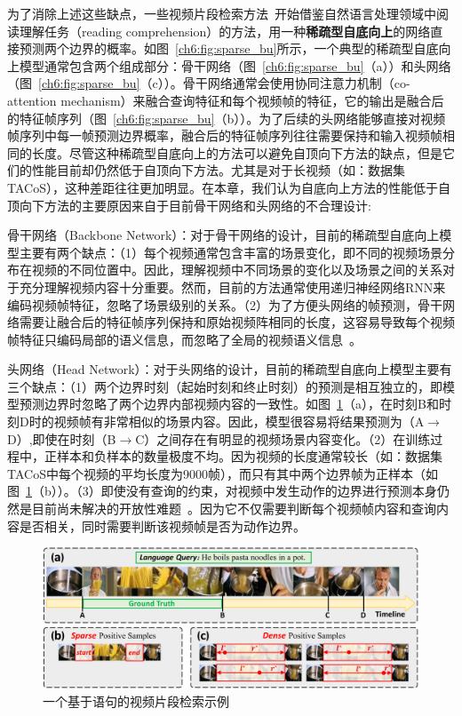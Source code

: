 为了消除上述这些缺点，一些视频片段检索方法~\cite{chen2019localizing,yuan2019find,feng2018video}开始借鉴自然语言处理领域中阅读理解任务（reading comprehension）的方法\cite{xiong2017dynamic,xiong2018dcn+,yu2018qanet}，用一种\textbf{稀疏型自底向上}的网络直接预测两个边界的概率。如图~\ref{ch6:fig:sparse_bu}所示，一个典型的稀疏型自底向上模型通常包含两个组成部分：骨干网络（图~\ref{ch6:fig:sparse_bu}（a））和头网络（图~\ref{ch6:fig:sparse_bu}（c））。骨干网络通常会使用协同注意力机制（co-attention mechanism）来融合查询特征和每个视频帧的特征，它的输出是融合后的特征帧序列（图~\ref{ch6:fig:sparse_bu}（b））。为了后续的头网络能够直接对视频帧序列中每一帧预测边界概率，融合后的特征帧序列往往需要保持和输入视频帧相同的长度。尽管这种稀疏型自底向上的方法可以避免自顶向下方法的缺点，但是它们的性能目前却仍然低于自顶向下方法。尤其是对于长视频（如：数据集TACoS），这种差距往往更加明显。在本章，我们认为自底向上方法的性能低于自顶向下方法的主要原因来自于目前骨干网络和头网络的不合理设计:

骨干网络（Backbone Network）：对于骨干网络的设计，目前的稀疏型自底向上模型主要有两个缺点：（1）每个视频通常包含丰富的场景变化，即不同的视频场景分布在视频的不同位置中。因此，理解视频中不同场景的变化以及场景之间的关系对于充分理解视频内容十分重要。然而，目前的方法通常使用递归神经网络RNN来编码视频帧特征，忽略了场景级别的关系。（2）为了方便头网络的帧预测，骨干网络需要让融合后的特征帧序列保持和原始视频阵相同的长度，这容易导致每个视频帧特征只编码局部的语义信息，而忽略了全局的视频语义信息~\cite{chen2018encoder,lin2017feature}。

头网络（Head Network）：对于头网络的设计，目前的稀疏型自底向上模型主要有三个缺点：（1）两个边界时刻（起始时刻和终止时刻）的预测是相互独立的，即模型预测边界时忽略了两个边界内部视频内容的一致性。如图~\ref{ch6:fig:headnetwork_motivation}（a），在时刻B和时刻D时的视频帧有非常相似的场景内容。因此，模型很容易将结果预测为（A$\to$D）,即使在时刻（B$\to$C）之间存在有明显的视频场景内容变化。（2）在训练过程中，正样本和负样本的数量极度不均。因为视频的长度通常较长（如：数据集TACoS中每个视频的平均长度为9000帧），而只有其中两个边界帧为正样本（如图~\ref{ch6:fig:headnetwork_motivation}（b））。（3）即使没有查询的约束，对视频中发生动作的边界进行预测本身仍然是目前尚未解决的开放性难题~\cite{shou2018online}。因为它不仅需要判断每个视频帧内容和查询内容是否相关，同时需要判断该视频帧是否为动作边界。

\begin{figure}[t]
    \centering
    \includegraphics[width=0.98\linewidth]{chapter6/res/headnetwork_motivation.pdf}
    \caption{一个基于语句的视频片段检索示例}
    \label{ch6:fig:headnetwork_motivation}
\end{figure}


